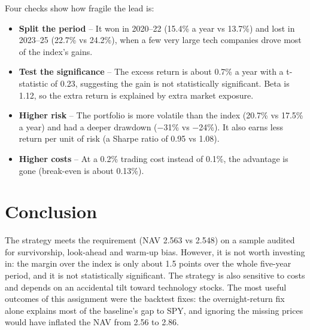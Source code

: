\documentclass[10pt]{article}
\begin{document}
Four checks show how fragile the lead is:
\begin{itemize}\setlength{\itemsep}{1pt}
\item \textbf{Split the period} -- It won in 2020--22 (15.4\% a year vs 13.7\%) and lost in 2023--25
(22.7\% vs 24.2\%), when a few very large tech companies drove most of the index's gains.
\item \textbf{Test the significance} -- The excess return is about 0.7\% a year with a t-statistic of
0.23, suggesting the gain is not statistically significant. Beta is 1.12, so the extra return is
explained by extra market exposure.
\item \textbf{Higher risk} -- The portfolio is more volatile than the index (20.7\% vs 17.5\% a year)
and had a deeper drawdown ($-$31\% vs $-$24\%). It also earns less return per unit of risk (a Sharpe
ratio of 0.95 vs 1.08).
\item \textbf{Higher costs} -- At a 0.2\% trading cost instead of 0.1\%, the advantage is gone
(break-even is about 0.13\%).
\end{itemize}

\section{Conclusion}
The strategy meets the requirement (NAV 2.563 vs 2.548) on a sample audited for survivorship,
look-ahead and warm-up bias. However, it is not worth investing in: the margin over the index is only
about 1.5 points over the whole five-year period, and it is not statistically significant. The
strategy is also sensitive to costs and depends on an accidental tilt toward technology stocks. The
most useful outcomes of this assignment were the backtest fixes: the overnight-return fix alone
explains most of the baseline's gap to SPY, and ignoring the missing prices would have inflated the
NAV from 2.56 to 2.86.
\end{document}
